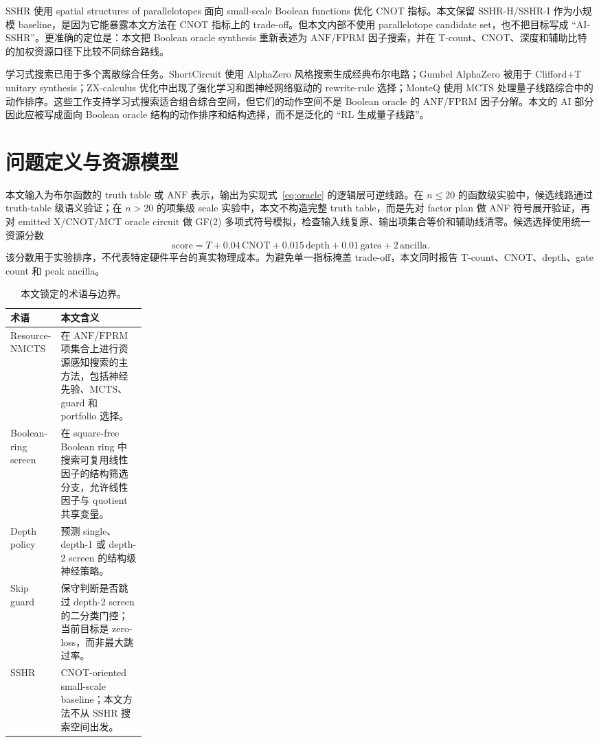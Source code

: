 \documentclass[UTF8,fontset=macnew,11pt]{ctexart}
\newcommand{\method}{Resource-NMCTS}
\newcommand{\screen}{Boolean-ring screen}
\newcommand{\score}{\ensuremath{\mathrm{score}}}
\newcommand{\anf}{\ensuremath{\mathrm{ANF}}}
\newcommand{\fprm}{\ensuremath{\mathrm{FPRM}}}
\newcommand{\mcts}{\ensuremath{\mathrm{MCTS}}}
\begin{document}
SSHR 使用 spatial structures of parallelotopes 面向 small-scale Boolean functions 优化 CNOT 指标\cite{zheng2025sshr}。本文保留 SSHR-H/SSHR-I 作为小规模 baseline，是因为它能暴露本文方法在 CNOT 指标上的 trade-off。但本文内部不使用 parallelotope candidate set，也不把目标写成 ``AI-SSHR''。更准确的定位是：本文把 Boolean oracle synthesis 重新表述为 \anf{}/\fprm{} 因子搜索，并在 T-count、CNOT、深度和辅助比特的加权资源口径下比较不同综合路线。

学习式搜索已用于多个离散综合任务。ShortCircuit 使用 AlphaZero 风格搜索生成经典布尔电路\cite{tsaras2024shortcircuit}；Gumbel AlphaZero 被用于 Clifford+T unitary synthesis\cite{rietsch2024unitary}；ZX-calculus 优化中出现了强化学习和图神经网络驱动的 rewrite-rule 选择\cite{riu2025rlzx}；MonteQ 使用 \mcts{} 处理量子线路综合中的动作排序\cite{machiya2026monteq}。这些工作支持学习式搜索适合组合综合空间，但它们的动作空间不是 Boolean oracle 的 \anf{}/\fprm{} 因子分解。本文的 AI 部分因此应被写成面向 Boolean oracle 结构的动作排序和结构选择，而不是泛化的 ``RL 生成量子线路''。

\section{问题定义与资源模型}

本文输入为布尔函数的 truth table 或 \anf{} 表示，输出为实现式~\eqref{eq:oracle} 的逻辑层可逆线路。在 $n\leq20$ 的函数级实验中，候选线路通过 truth-table 级语义验证；在 $n>20$ 的项集级 scale 实验中，本文不构造完整 truth table，而是先对 factor plan 做 ANF 符号展开验证，再对 emitted X/CNOT/MCT oracle circuit 做 GF(2) 多项式符号模拟，检查输入线复原、输出项集合等价和辅助线清零。候选选择使用统一资源分数
\begin{equation}
  \score = T + 0.04\,\mathrm{CNOT} + 0.015\,\mathrm{depth}
         + 0.01\,\mathrm{gates} + 2\,\mathrm{ancilla}.
  \label{eq:score}
\end{equation}
该分数用于实验排序，不代表特定硬件平台的真实物理成本。为避免单一指标掩盖 trade-off，本文同时报告 T-count、CNOT、depth、gate count 和 peak ancilla。

\begin{table}[t]
\centering
\small
\caption{本文锁定的术语与边界。}
\label{tab:terms}
\begin{tabularx}{\linewidth}{>{\raggedright\arraybackslash}p{0.23\linewidth}>{\raggedright\arraybackslash}X}
\toprule
术语 & 本文含义 \\
\midrule
\method{} & 在 \anf{}/\fprm{} 项集合上进行资源感知搜索的主方法，包括神经先验、\mcts{}、guard 和 portfolio 选择。 \\
\screen{} & 在 square-free Boolean ring 中搜索可复用线性因子的结构筛选分支，允许线性因子与 quotient 共享变量。 \\
Depth policy & 预测 single、depth-1 或 depth-2 screen 的结构级神经策略。 \\
Skip guard & 保守判断是否跳过 depth-2 screen 的二分类门控；当前目标是 zero-loss，而非最大跳过率。 \\
SSHR & CNOT-oriented small-scale baseline；本文方法不从 SSHR 搜索空间出发。 \\
\bottomrule
\end{tabularx}
\end{table}
\end{document}
